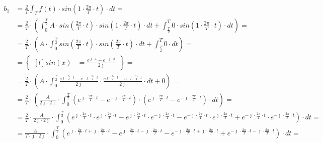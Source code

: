 \begin{task}


\begin{align*}
b_1&=\frac{2}{T}\int_{T}f(t) \cdot sin\left( 1 \cdot \frac{2\pi}{T} \cdot t\right) \cdot dt=\\
&=\frac{2}{T}\cdot\left(\int_{0}^{\frac{T}{2}}A \cdot sin\left( \frac{2\pi}{T} \cdot t\right) \cdot sin\left( 1 \cdot \frac{2\pi}{T} \cdot t\right) \cdot dt+\int_{\frac{T}{2}}^{T} 0 \cdot sin\left( 1 \cdot \frac{2\pi}{T} \cdot t\right) \cdot dt\right)=\\
&=\frac{2}{T}\cdot\left(A \cdot \int_{0}^{\frac{T}{2}}sin\left( \frac{2\pi}{T} \cdot t\right) \cdot sin\left( \frac{2\pi}{T} \cdot t\right) \cdot dt+\int_{\frac{T}{2}}^{T} 0 \cdot dt\right)=\\
&=\begin{Bmatrix*}[l]
sin\left(x\right)&=\frac{e^{\jmath \cdot x}-e^{-\jmath \cdot x}}{2 \jmath }
\end{Bmatrix*}=\\
&=\frac{2}{T}\cdot\left(A \cdot \int_{0}^{\frac{T}{2}} \frac{e^{\jmath \cdot \frac{2\pi}{T} \cdot t}-e^{-\jmath \cdot \frac{2\pi}{T} \cdot t}}{2\jmath} \cdot \frac{e^{\jmath \cdot \frac{2\pi}{T} \cdot t}-e^{-\jmath \cdot \frac{2\pi}{T} \cdot t}}{2\jmath} \cdot dt+0\right)=\\
&=\frac{2}{T}\cdot\left(\frac{A}{2\jmath\cdot 2\jmath} \cdot \int_{0}^{\frac{T}{2}} \left(e^{\jmath \cdot \frac{2\pi}{T} \cdot t}-e^{-\jmath \cdot \frac{2\pi}{T} \cdot t}\right)\cdot \left(e^{\jmath \cdot \frac{2\pi}{T} \cdot t}-e^{-\jmath \cdot \frac{2\pi}{T} \cdot t}\right) \cdot dt\right)=\\
&=\frac{2}{T} \cdot \frac{A}{2\jmath\cdot 2\jmath} \cdot \int_{0}^{\frac{T}{2}} \left(e^{\jmath \cdot \frac{2\pi}{T} \cdot t} \cdot e^{\jmath \cdot \frac{2\pi}{T} \cdot t} - e^{\jmath \cdot \frac{2\pi}{T} \cdot t} \cdot e^{-\jmath \cdot \frac{2\pi}{T} \cdot t} - e^{-\jmath \cdot \frac{2\pi}{T} \cdot t} \cdot e^{\jmath \cdot \frac{2\pi}{T} \cdot t} + e^{-\jmath \cdot \frac{2\pi}{T} \cdot t} \cdot e^{-\jmath \cdot \frac{2\pi}{T} \cdot t} \right) \cdot dt=\\
&=\frac{A}{T\cdot \jmath \cdot 2\jmath} \cdot \int_{0}^{\frac{T}{2}} \left(e^{\jmath \cdot \frac{2\pi}{T} \cdot t + \jmath \cdot \frac{2\pi}{T} \cdot t} - e^{\jmath \cdot \frac{2\pi}{T} \cdot t -\jmath \cdot \frac{2\pi}{T} \cdot t} - e^{-\jmath \cdot \frac{2\pi}{T} \cdot t+ \jmath \cdot \frac{2\pi}{T} \cdot t} + e^{-\jmath \cdot \frac{2\pi}{T} \cdot t -\jmath \cdot \frac{2\pi}{T} \cdot t} \right) \cdot dt=\\

\end{align*}
\end{task}
